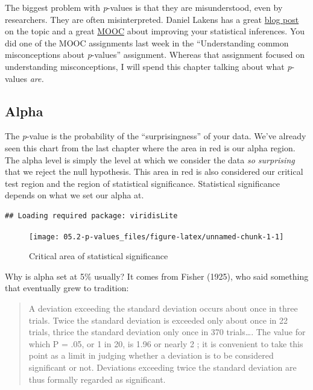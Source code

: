 \documentclass[
]{book}
\begin{document}
The biggest problem with \emph{p}-values is that they are misunderstood, even by researchers. They are often misinterpreted. Daniel Lakens has a great \href{http://daniellakens.blogspot.com/2017/12/understanding-common-misconceptions.html}{blog post} on the topic and a great \href{https://www.coursera.org/learn/statistical-inferences}{MOOC} about improving your statistical inferences. You did one of the MOOC assignments last week in the ``Understanding common misconceptions about \emph{p}-values'' assignment. Whereas that assignment focused on understanding misconceptions, I will spend this chapter talking about what \emph{p}-values \emph{are.}

\hypertarget{alpha}{%
\subsection{Alpha}\label{alpha}}

The \emph{p}-value is the probability of the ``surprisingness'' of your data. We've already seen this chart from the last chapter where the area in red is our alpha region. The alpha level is simply the level at which we consider the data \emph{so surprising} that we reject the null hypothesis. This area in red is also considered our critical test region and the region of statistical significance. Statistical significance depends on what we set our alpha at.

\begin{verbatim}
## Loading required package: viridisLite
\end{verbatim}

\begin{figure}

{\centering \texttt{[image: 05.2-p-values\_files/figure-latex/unnamed-chunk-1-1]} 

}

\caption{Critical area of statistical significance}\label{fig:unnamed-chunk-1}
\end{figure}

Why is alpha set at 5\% usually? It comes from Fisher (1925), who said something that eventually grew to tradition:

\begin{quote}
A deviation exceeding the standard deviation occurs about once in three trials. Twice the standard deviation is exceeded only about once in 22 trials, thrice the standard deviation only once in 370 trials\ldots. The value for which P = .05, or 1 in 20, is 1.96 or nearly 2 ; it is convenient to take this point as a limit in judging whether a deviation is to be considered significant or not. Deviations exceeding twice the standard deviation are thus formally regarded as significant.
\end{quote}
\end{document}
